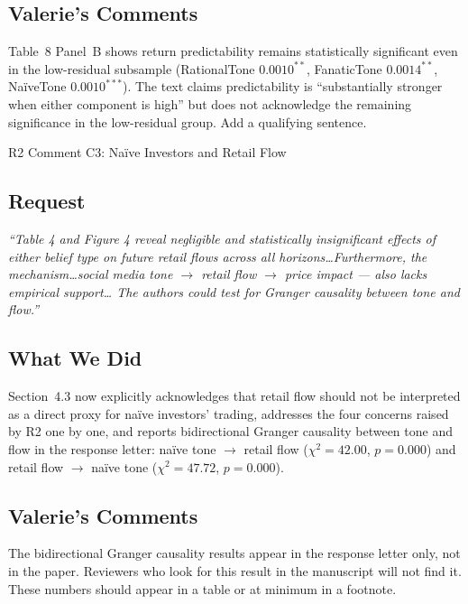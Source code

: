 \documentclass[11pt]{article}
\makeatletter
\def\section{\@ifstar\section@star\section@nostar}
\def\section@star#1{%
  \par\vspace{1.5ex}%
  \noindent{\normalsize\bfseries#1}\par%
  \vspace{0.5ex}%
  \@afterheading%
}
\def\section@nostar#1{%
  \par\vspace{1.5ex}%
  \noindent{%
    \setlength{\fboxsep}{4pt}%
    \colorbox{sectionbg}{\parbox{\dimexpr\textwidth-8pt\relax}{\normalsize\bfseries\strut#1\strut}}%
  }\par%
  \vspace{0.5ex}%
  \@afterheading%
}
\newcommand{\concern}[1]{#1}
\makeatother
\begin{document}
\subsection*{Valerie's Comments}
\concern{Table~8 Panel~B shows return predictability remains statistically
significant even in the low-residual subsample (RationalTone $0.0010^{**}$,
FanaticTone $0.0014^{**}$, Na\"{i}veTone $0.0010^{***}$). The text claims
predictability is ``substantially stronger when either component is high''
but does not acknowledge the remaining significance in the low-residual group.
Add a qualifying sentence.}

\section{R2 Comment C3: Na\"{i}ve Investors and Retail Flow}

\subsection*{Request}
\begin{mdframed}
\textit{``Table 4 and Figure 4 reveal negligible and statistically
insignificant effects of either belief type on future retail flows across
all horizons\ldots Furthermore, the mechanism\ldots social media tone
$\to$ retail flow $\to$ price impact --- also lacks empirical support\ldots
The authors could test for Granger causality between tone and flow.''}
\end{mdframed}

\subsection*{What We Did}
Section~4.3 now explicitly acknowledges that retail flow should not be
interpreted as a direct proxy for na\"{i}ve investors' trading, addresses
the four concerns raised by R2 one by one, and reports bidirectional Granger
causality between tone and flow in the response letter: na\"{i}ve tone
$\to$ retail flow ($\chi^2=42.00$, $p=0.000$) and retail flow $\to$
na\"{i}ve tone ($\chi^2=47.72$, $p=0.000$).

\subsection*{Valerie's Comments}
\concern{The bidirectional Granger causality results appear in the response
letter only, not in the paper. Reviewers who look for this result in the
manuscript will not find it. These numbers should appear in a table or at
minimum in a footnote.}
\end{document}
